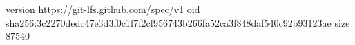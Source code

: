 version https://git-lfs.github.com/spec/v1
oid sha256:3c2270dedc47e3d3f0c1f7f2cf956743b266fa52ca3f848daf540c92b93123ae
size 87540
